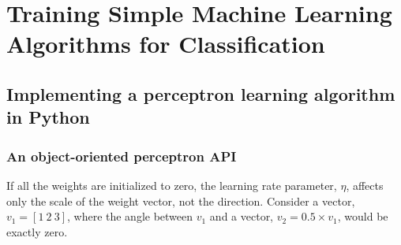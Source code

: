 \chapter{Training Simple Machine Learning Algorithms for Classification\label{Ch02}}
\section{Implementing a perceptron learning algorithm in Python}
\subsection{An object-oriented perceptron API}
If all the weights are initialized to zero, the learning rate parameter, $\eta$, affects only the scale of the weight vector, not the direction. Consider a vector,$v_1 =[1~2~3]$, where the angle between $v_1$ and a vector, $v_2 = 0.5 \times v_1$, would be exactly zero.